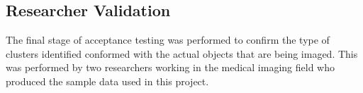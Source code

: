 \subsection{Researcher Validation}
\label{sub:researcher_validation}

The final stage of acceptance testing was performed to confirm the type of
clusters identified conformed with the actual objects that are being imaged.
This was performed by two researchers working in the medical imaging field who
produced the sample data used in this project.
